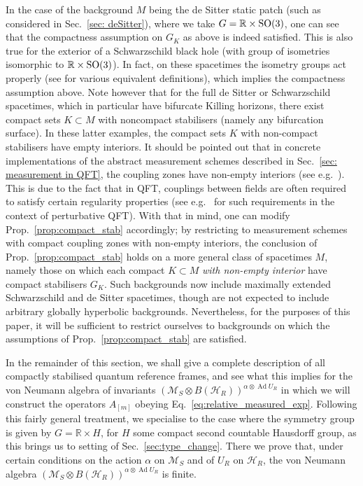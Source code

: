\documentclass[sn-mathphys-num]{sn-jnl}%
\newcommand{\RR}{\mathbb{R}}
\newcommand{\HH}{\mathcal{H}}
\newcommand{\MM}{\mathcal{M}}
\DeclareMathOperator{\Ad}{Ad}
\numberwithin{equation}{section}
\theoremstyle{thmstyleone}%
\theoremstyle{thmstyletwo}%
\theoremstyle{thmstylethree}%
\begin{document}
In the case of the background $M$ being the de Sitter static patch (such as considered in Sec.~\ref{sec: deSitter}), where we take $G=\RR\times \textnormal{SO}(3)$, one can see that the compactness assumption on $G_K$ as above is indeed satisfied. This is also true for the exterior of a Schwarzschild black hole (with group of isometries isomorphic to $\RR\times \textnormal{SO}(3)$). In fact, on these spacetimes the isometry groups act properly (see \cite[Thm.~1.2.9]{palaisExistenceSlicesActions1961} for various equivalent definitions), which implies the compactness assumption above. Note however that for the full de Sitter or Schwarzschild spacetimes, which in particular have bifurcate Killing horizons, there exist compact sets $K\subset M$ with noncompact stabilisers (namely any bifurcation surface). In these latter examples, the compact sets $K$ with non-compact stabilisers have empty interiors. It should be pointed out that in concrete implementations of the abstract measurement schemes described in Sec.~\ref{sec: measurement in QFT}, the coupling zones have non-empty interiors (see e.g.~\cite{FewVer_QFLM:2018}). This is due to the fact that in QFT, couplings between fields are often required to satisfy certain regularity properties (see e.g.~\cite{hawkinsNovelClassFunctionals2024} for such requirements in the context of perturbative QFT). With that in mind, one can modify Prop.~\ref{prop:compact_stab} accordingly; by restricting to measurement schemes with compact coupling zones with non-empty interiors, the conclusion of Prop.~\ref{prop:compact_stab} holds on a more general class of spacetimes $M$, namely those on which each compact $K\subset M$ \emph{with non-empty interior} have compact stabilisers $G_K$. Such backgrounds now include maximally extended Schwarzschild and de Sitter spacetimes, though are not expected to include arbitrary globally hyperbolic backgrounds. Nevertheless, for the purposes of this paper, it will be sufficient to restrict ourselves to backgrounds on which the assumptions of Prop.~\ref{prop:compact_stab} are satisfied.

In the remainder of this section, we shall give a complete description of all compactly stabilised quantum reference frames, and see what this implies for the von Neumann algebra of invariants $(\MM_S\otimes B(\HH_R))^{\alpha\otimes \Ad U_R}$ in which we will construct the operators $A_{[m]}$ obeying Eq.~\eqref{eq:relative_measured_exp}. Following this fairly general treatment, we specialise to the case where the symmetry group is given by $G=\RR\times H$, for $H$ some compact second countable Hausdorff group, as this brings us to setting of Sec.\ \ref{sec:type_change}. There we prove that, under certain conditions on the action $\alpha$ on $\MM_S$ and of $U_R$ on $\HH_R$, the von Neumann algebra $(\MM_S\otimes B(\HH_R))^{\alpha\otimes \Ad U_R}$ is finite.
\end{document}
